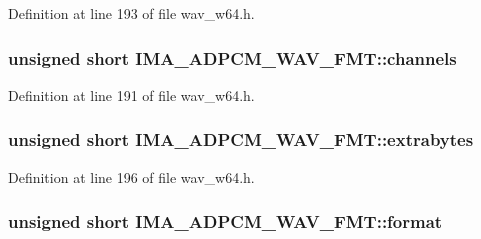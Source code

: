 Definition at line 193 of file wav\+\_\+w64.\+h.

\subsubsection[{\texorpdfstring{channels}{channels}}]{\setlength{\rightskip}{0pt plus 5cm}unsigned short I\+M\+A\+\_\+\+A\+D\+P\+C\+M\+\_\+\+W\+A\+V\+\_\+\+F\+M\+T\+::channels}\hypertarget{struct_i_m_a___a_d_p_c_m___w_a_v___f_m_t_a302decd1d4bb70e338bfef02e4a65845}{}\label{struct_i_m_a___a_d_p_c_m___w_a_v___f_m_t_a302decd1d4bb70e338bfef02e4a65845}


Definition at line 191 of file wav\+\_\+w64.\+h.

\subsubsection[{\texorpdfstring{extrabytes}{extrabytes}}]{\setlength{\rightskip}{0pt plus 5cm}unsigned short I\+M\+A\+\_\+\+A\+D\+P\+C\+M\+\_\+\+W\+A\+V\+\_\+\+F\+M\+T\+::extrabytes}\hypertarget{struct_i_m_a___a_d_p_c_m___w_a_v___f_m_t_a155eb8cdf1fb8e65d693fcdfa011861e}{}\label{struct_i_m_a___a_d_p_c_m___w_a_v___f_m_t_a155eb8cdf1fb8e65d693fcdfa011861e}


Definition at line 196 of file wav\+\_\+w64.\+h.

\subsubsection[{\texorpdfstring{format}{format}}]{\setlength{\rightskip}{0pt plus 5cm}unsigned short I\+M\+A\+\_\+\+A\+D\+P\+C\+M\+\_\+\+W\+A\+V\+\_\+\+F\+M\+T\+::format}\hypertarget{struct_i_m_a___a_d_p_c_m___w_a_v___f_m_t_aa33b040c885f3c536a1dd34a5917cb38}{}\label{struct_i_m_a___a_d_p_c_m___w_a_v___f_m_t_aa33b040c885f3c536a1dd34a5917cb38}


